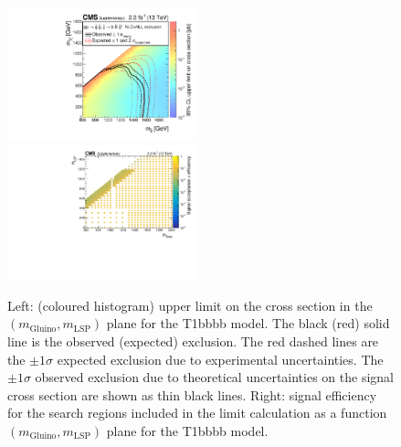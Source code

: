 \clearpage
\begin{figure}[t]
  \begin{center}
    \includegraphics[width=0.49\textwidth]{RA1T1bbbbXSEC_aux} \, 
    \includegraphics[width=0.49\textwidth]{T1bbbb_merging_4_cats_aux} \,     
  \end{center}
  \caption{Left: (coloured histogram) upper limit on the cross section in the $(m_{\mathrm{Gluino}},m_{\mathrm{LSP}})$ plane for the T1bbbb model. 
  The black (red) solid line is the observed (expected) exclusion. The red dashed lines are the $\pm1\sigma$ expected exclusion due to experimental uncertainties. 
  The $\pm1\sigma$ observed exclusion due to theoretical uncertainties on the signal cross section are shown as thin black lines. 
  Right: signal efficiency for the search regions included in the limit calculation as a function $(m_{\mathrm{Gluino}},m_{\mathrm{LSP}})$ plane for the T1bbbb model. 
  \label{fig:T1bbbb_excl}}
\end{figure}

